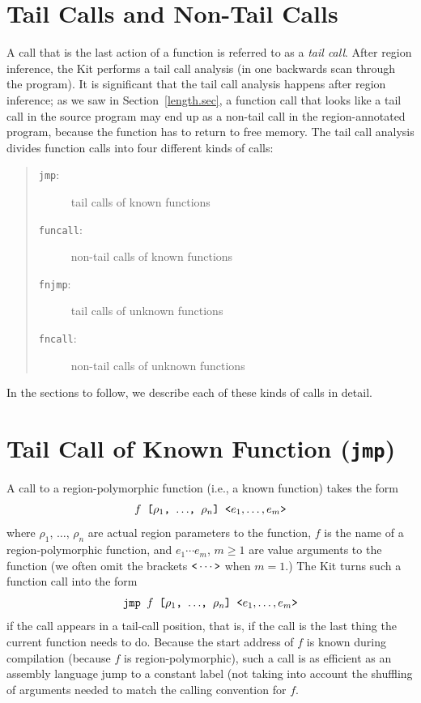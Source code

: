 \documentclass[12pt]{book}
\begin{document}
\section{Tail Calls and Non-Tail Calls}
\label{tailcall.sec}
A call that is the last action of a function is referred to as a {\em
  tail call}. After region inference, the Kit performs a tail call
analysis (in one backwards scan through the program). It is
significant that the tail call analysis happens after region
inference; as we saw in Section~\ref{length.sec}, a function call that
looks like a tail call in the source program may end up as a non-tail
call in the region-annotated program, because the function has to
return to free memory. The tail call analysis divides function calls
into four different kinds of calls:
\begin{quote}
\begin{description}
\item[{\tt jmp}:] tail calls of known functions
\item[{\tt funcall}:] non-tail calls of known functions
\item[{\tt fnjmp}:] tail calls of unknown functions
\item[{\tt fncall}:] non-tail calls of unknown functions
\end{description}
\end{quote}
In the sections to follow, we describe each of these kinds of calls in
detail.

\section{Tail Call of Known Function ({\tt jmp})}
\label{simplejump.sec}
A call to a
%
region-polymorphic function (i.e., a known function) takes the form
$$\hbox{\tt $f$ [$\rho_1$, $\ldots$, $\rho_n$] <$e_1,\ldots,e_m$>}$$
where $\rho_1$, $\ldots$, $\rho_n$ are actual region parameters to the
function, $f$ is the name of a region-polymorphic function, and
$e_1 \cdots e_m$, $m \geq 1$ are value arguments to the function (we
often omit the brackets $\verb+<+ \cdots \verb+>+$ when $m = 1$.) The Kit
turns such a function call into the form
$$\hbox{\tt jmp $f$ [$\rho_1$, $\ldots$, $\rho_n$] <$e_1,\ldots,e_m$>}$$
if the call
appears in a tail-call position, that is, if the call is the last
thing the current function needs to do.  Because the start address of
$f$ is known during compilation (because $f$ is region-polymorphic),
such a call is as efficient as an assembly language jump to a constant
label (not taking into account the shuffling of arguments needed to
match the calling convention for $f$.
\end{document}
